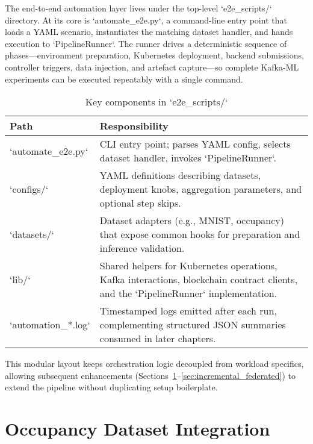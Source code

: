 The end-to-end automation layer lives under the top-level `e2e\_scripts/` directory. At its core is `automate\_e2e.py`, a command-line entry point that loads a YAML scenario, instantiates the matching dataset handler, and hands execution to `PipelineRunner`. The runner drives a deterministic sequence of phases—environment preparation, Kubernetes deployment, backend submissions, controller triggers, data injection, and artefact capture—so complete Kafka-ML experiments can be executed repeatably with a single command.

\begin{table}[h!]
    \centering
    \caption{Key components in `e2e\_scripts/`}
    \label{tab:e2e_components}
    \begin{tabular}{p{} p{}}
        \toprule
        \textbf{Path} & \textbf{Responsibility} \\
        \midrule
        `automate\_e2e.py` & CLI entry point; parses YAML config, selects dataset handler, invokes `PipelineRunner`. \\
        `configs/` & YAML definitions describing datasets, deployment knobs, aggregation parameters, and optional step skips. \\
        `datasets/` & Dataset adapters (e.g., MNIST, occupancy) that expose common hooks for preparation and inference validation. \\
        `lib/` & Shared helpers for Kubernetes operations, Kafka interactions, blockchain contract clients, and the `PipelineRunner` implementation. \\
        `automation_*.log` & Timestamped logs emitted after each run, complementing structured JSON summaries consumed in later chapters. \\
    \bottomrule
    \end{tabular}
\end{table}

This modular layout keeps orchestration logic decoupled from workload specifics, allowing subsequent enhancements (Sections~\ref{sec:occupancy_integration}--\ref{sec:incremental_federated}) to extend the pipeline without duplicating setup boilerplate.

\section{Occupancy Dataset Integration}
\label{sec:occupancy_integration}


